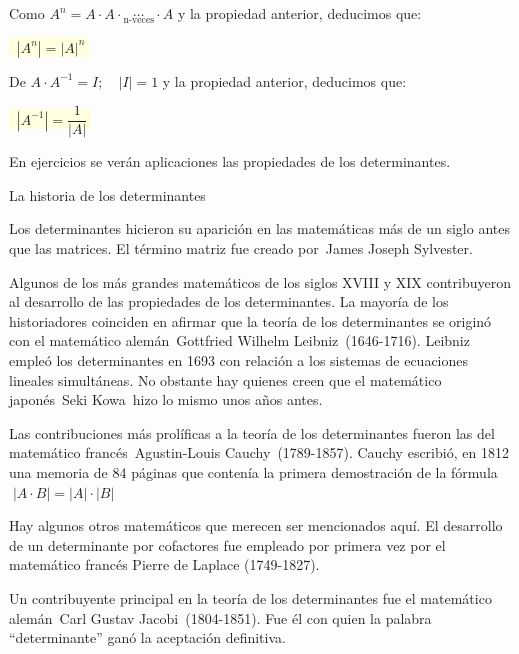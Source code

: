 \begin{enumerate}[P.D. 1]
Como $A^n=A\cdot A \cdot \underset{\text{n-veces}}{\cdots} \cdot A $ y la propiedad anterior, deducimos que:

\vspace{2mm} \centerline{\colorbox{LightYellow}{$\; \boxed {\; |A^{n}|= |A|^n \; }$}}

 De $A\cdot A^{-1}=I; \quad |I|=1$ y la propiedad anterior, deducimos que:

\vspace{2mm} \centerline{\colorbox{LightYellow}{$\; \boxed {\; |A^{-1}|= \dfrac {1}{|A|} \; }$}}

\end{enumerate}

\normalsize{En ejercicios se verán aplicaciones las propiedades de los determinantes.}



\begin{myexampleblock}{La historia de los determinantes}

\small{Los determinantes hicieron su aparición en las matemáticas más de un siglo antes que las matrices. El término matriz fue creado por James Joseph Sylvester.}

\small{\vspace{1mm} Algunos de los más grandes matemáticos de los siglos XVIII y XIX contribuyeron al desarrollo de las propiedades de los determinantes. La mayoría de los historiadores coinciden en afirmar que la teoría de los determinantes se originó con el matemático alemán Gottfried Wilhelm Leibniz (1646-1716). Leibniz empleó los determinantes en 1693 con relación a los sistemas de ecuaciones lineales simultáneas. No obstante hay quienes creen que el matemático japonés Seki Kowa hizo lo mismo unos años antes.}

\small{\vspace{1mm} Las contribuciones más prolíficas a la teoría de los determinantes fueron las del matemático francés Agustin-Louis Cauchy (1789-1857). Cauchy escribió, en 1812 una memoria de 84 páginas que contenía la primera demostración de la fórmula $\; |A\cdot B|=|A|\cdot |B|$}

\small{\vspace{1mm} Hay algunos otros matemáticos que merecen ser mencionados aquí. El desarrollo de un determinante por cofactores fue empleado por primera vez por el matemático francés Pierre de Laplace (1749-1827).} 

\small{\vspace{1mm} Un contribuyente principal en la teoría de los determinantes fue el matemático alemán Carl Gustav Jacobi (1804-1851). Fue él con quien la palabra “determinante” ganó la aceptación definitiva.}


\end{myexampleblock}



